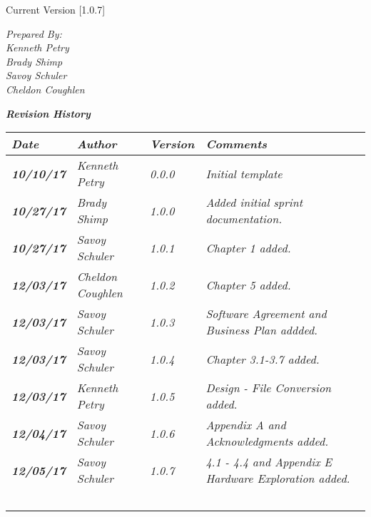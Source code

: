 


Current Version [1.0.7]
\vspace*{5mm}

{\color{SDColor5}
\noindent
\textit{Prepared By:}\\
\textit{Kenneth Petry}\\
\textit{Brady Shimp}\\
\textit{Savoy Schuler}\\
\textit{Cheldon Coughlen}
}

\vfill
\noindent
{\color{SDColor3} \textit{\textbf{Revision History}}}\\
\begin{tabular}{|>{\raggedright}p{1.5cm}|>{\raggedright}p{3cm}|>{\raggedright}p{1.5cm}|>{\raggedright}p{9cm}|}
  \hline
  \textit{\textbf{Date}} &  \textit{\textbf{Author}} & \textit{\textbf{Version}} & \textit{\textbf{Comments}}\tabularnewline
  \hline
  \textit{\textbf{10/10/17}} & \textit{Kenneth Petry} & \textit{0.0.0} & \textit{Initial template}\tabularnewline\hline
  \textit{\textbf{10/27/17}} & \textit{Brady Shimp} & \textit{1.0.0} & \textit{Added initial sprint documentation.}\tabularnewline\hline
  \textit{\textbf{10/27/17}} & \textit{Savoy Schuler} & \textit{1.0.1} & \textit{Chapter 1 added.}\tabularnewline\hline
  \textit{\textbf{12/03/17}} & \textit{Cheldon Coughlen} & \textit{1.0.2} & \textit{Chapter 5 added.}\tabularnewline\hline
  \textit{\textbf{12/03/17}} & \textit{Savoy Schuler} & \textit{1.0.3} & \textit{Software Agreement and Business Plan addded.}\tabularnewline\hline
  \textit{\textbf{12/03/17}} & \textit{Savoy Schuler} & \textit{1.0.4} & \textit{Chapter 3.1-3.7 added.}\tabularnewline\hline
  \textit{\textbf{12/03/17}} & \textit{Kenneth Petry} & \textit{1.0.5} & \textit{Design - File Conversion added.}\tabularnewline\hline  \textit{\textbf{12/04/17}} & \textit{Savoy Schuler} & \textit{1.0.6} & \textit{Appendix A and Acknowledgments added.}\tabularnewline\hline
  \textit{\textbf{12/05/17}} & \textit{Savoy Schuler} & \textit{1.0.7} & \textit{4.1 - 4.4 and Appendix E Hardware Exploration added.}\tabularnewline\hline
  &  &  & \tabularnewline
  \hline
  &  &  & \tabularnewline
  \hline
  &  &  & \tabularnewline
  \hline
  &  &  & \tabularnewline
  \hline
  &  &  & \tabularnewline
  \hline
\end{tabular}
\vfill

